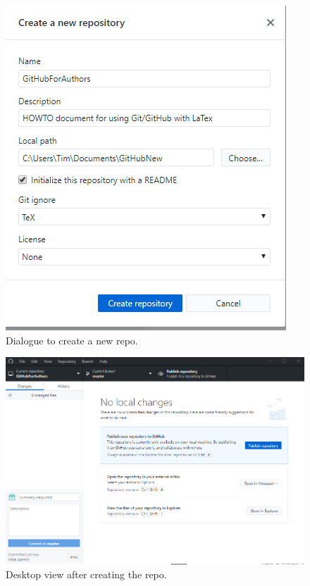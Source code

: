 \documentclass[a4paper, 12pt]{article}
\begin{document}
\begin{figure}
\centering
\includegraphics{NewRepo}
\caption{Dialogue to create a new repo.}
\label{newrepo}
\end{figure}

\begin{figure}
\centering
\includegraphics[width=\linewidth]{NewRepoFirstView}
\caption{Desktop view after creating the repo.}
\label{repofirstview}
\end{figure}
\end{document}
